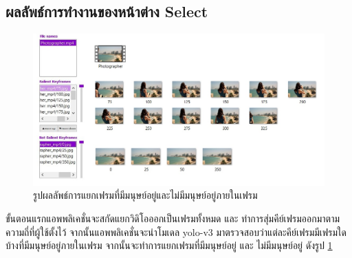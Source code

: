 \subsection*{ผลลัพธ์การทำงานของหน้าต่าง Select}
\begin{figure}[!ht]
  \centering
    \includegraphics[scale=0.6]{chapter4/images/Result/result_select3.jpg}
    \caption{รูปผลลัพธ์การแยกเฟรมที่มีมนุษย์อยู่และไม่มีมนุษย์อยู่ภายในเฟรม}
    \label{fig:result_select}
\end{figure}
ขั้นตอนแรกแอพพลิเคชั่นจะสกัดแยกวิดิโอออกเป็นเฟรมทั้งหมด และ ทำการสุ่มคีย์เฟรมออกมาตามความถี่ที่ผู้ใช้ตั้งไว้ จากนั้นแอพพลิเคชั่นจะนำโมเดล yolo-v3 มาตรวจสอบว่าแต่ละคีย์เฟรมมีเฟรมใดบ้างที่มีมนุษย์อยู่ภายในเฟรม จากนั้นจะทำการแยกเฟรมที่มีมนุษย์อยู่ และ ไม่มีมนุษย์อยู่ ดังรูป \ref{fig:result_select}


